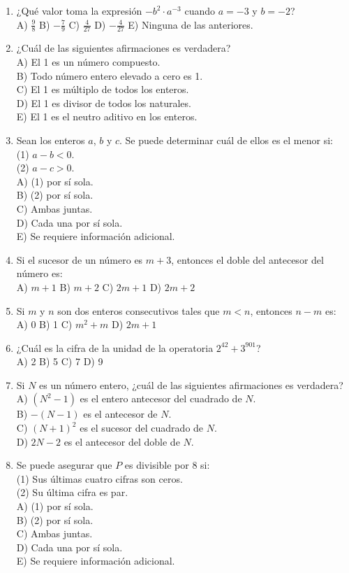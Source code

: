 \documentclass[11pt,letterpaper]{article}
\begin{document}
\begin{enumerate}[label=\textbf{\arabic*.}, leftmargin=*, itemsep=7pt]
\item ¿Qué valor toma la expresión $-b^2\cdot a^{-3}$ cuando $a=-3$ y $b=-2$?\\ A) $\frac98$ \quad B) $-\frac79$ \quad C) $\frac{4}{27}$ \quad D) $-\frac{4}{27}$ \quad E) Ninguna de las anteriores.
\item ¿Cuál de las siguientes afirmaciones es verdadera?\\ A) El 1 es un número compuesto.\\ B) Todo número entero elevado a cero es 1.\\ C) El 1 es múltiplo de todos los enteros.\\ D) El 1 es divisor de todos los naturales.\\ E) El 1 es el neutro aditivo en los enteros.
\item Sean los enteros $a$, $b$ y $c$. Se puede determinar cuál de ellos es el menor si: \\ (1) $a-b<0$. \\ (2) $a-c>0$.\\ A) (1) por sí sola.\\ B) (2) por sí sola.\\ C) Ambas juntas.\\ D) Cada una por sí sola.\\ E) Se requiere información adicional.
\item Si el sucesor de un número es $m+3$, entonces el doble del antecesor del número es: \\ A) $m+1$ \quad B) $m+2$ \quad C) $2m+1$ \quad D) $2m+2$
\item Si $m$ y $n$ son dos enteros consecutivos tales que $m<n$, entonces $n-m$ es: \\ A) 0 \quad B) 1 \quad C) $m^2+m$ \quad D) $2m+1$
\item ¿Cuál es la cifra de la unidad de la operatoria $2^{42}+3^{901}$?\\ A) 2 \quad B) 5 \quad C) 7 \quad D) 9
\item Si $N$ es un número entero, ¿cuál de las siguientes afirmaciones es verdadera?\\ A) $(N^2-1)$ es el entero antecesor del cuadrado de $N$.\\ B) $-(N-1)$ es el antecesor de $N$.\\ C) $(N+1)^2$ es el sucesor del cuadrado de $N$.\\ D) $2N-2$ es el antecesor del doble de $N$.
\item Se puede asegurar que $P$ es divisible por 8 si: \\ (1) Sus últimas cuatro cifras son ceros. \\ (2) Su última cifra es par.\\ A) (1) por sí sola.\\ B) (2) por sí sola.\\ C) Ambas juntas.\\ D) Cada una por sí sola.\\ E) Se requiere información adicional.

\end{enumerate}
\end{document}
